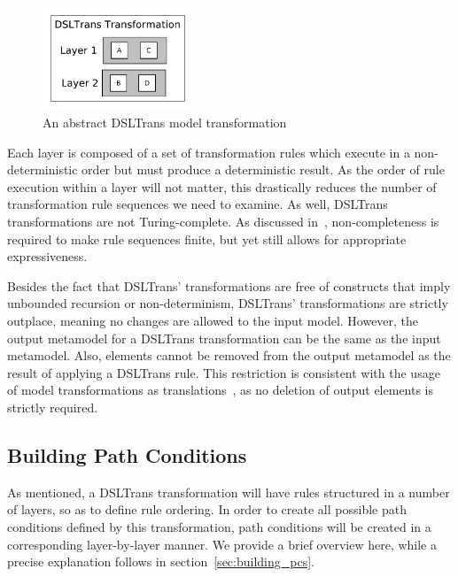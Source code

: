 \begin{figure}[h!]
	\centering
		\includegraphics[width=0.4\textwidth]{./figures/overview/abstractDSLTransTransformation.pdf}
	\caption{An abstract DSLTrans model transformation}
	\label{fig:dsltransformation2}
\end{figure}

Each layer is composed of a set of transformation rules which execute in a
non-deterministic order but must produce a deterministic result. As the order of rule execution within a
layer will not matter, this drastically reduces the number of transformation rule sequences we need to examine. As well, DSLTrans transformations are not Turing-complete. As discussed in~\cite{DBLP:conf/sle/BarrocaLAFS10},
non-completeness is required to make rule sequences finite, but yet still allows
for appropriate expressiveness.

Besides the fact that DSLTrans' transformations are free of constructs that
imply unbounded recursion or non-determinism, DSLTrans' transformations are strictly outplace, meaning no changes are allowed
to the input model. However, the output metamodel for a DSLTrans transformation can
be the same as the input metamodel. Also, elements cannot be removed
from the output metamodel as the result of applying a DSLTrans rule.
This restriction is consistent with the usage of model transformations as
translations~\cite{AMT2012}, as no deletion of output elements is strictly required.


\subsection{Building Path Conditions}

As mentioned, a DSLTrans transformation will have rules structured in a number of layers, so as to define rule ordering. In order to create all possible path conditions defined by this transformation, path conditions will be created in a corresponding layer-by-layer manner. We provide a brief overview here, while a precise explanation follows in section~\ref{sec:building_pcs}.


